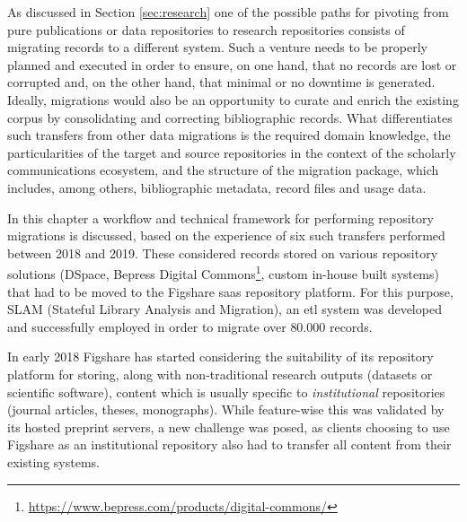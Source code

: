 As discussed in Section \ref{sec:research} one of the possible paths for pivoting from pure publications or data repositories to research repositories consists of migrating records to a different system. Such a venture needs to be properly planned and executed in order to ensure, on one hand, that no records are lost or corrupted and, on the other hand, that minimal or no downtime is generated. Ideally, migrations would also be an opportunity to curate and enrich the existing corpus by consolidating and correcting bibliographic records. What differentiates such transfers from other data migrations is the required domain knowledge, the particularities of the target and source repositories in the context of the scholarly communications ecosystem, and the structure of the migration package, which includes, among others, bibliographic metadata, record files and usage data.

In this chapter a workflow and technical framework for performing repository migrations is discussed, based on the experience of six such transfers performed between 2018 and 2019. These considered records stored on various repository solutions (DSpace, Bepress Digital Commons\footnote{\url{https://www.bepress.com/products/digital-commons/}}, custom in-house built systems) that had to be moved to the Figshare \gls{saas} repository platform. For this purpose, SLAM (Stateful  Library  Analysis  and  Migration), an \gls{etl} system was developed and successfully employed in order to migrate over $80.000$ records. 

In early 2018 Figshare has started considering the suitability of its repository platform for storing, along with non-traditional research outputs (datasets or scientific software), content which is usually specific to \emph{institutional} repositories (journal articles, theses, monographs)\cite{fir}. While feature-wise this was validated by its hosted preprint servers\cite{chem}, a new challenge was posed, as clients choosing to use Figshare as an institutional repository also had to transfer all content from their existing systems.

